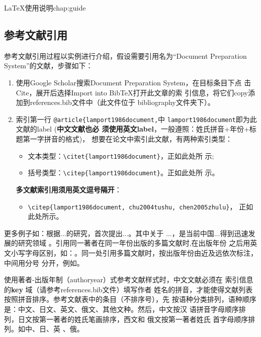 \begin{cuzchapter}{\LaTeX{}使用说明}{chap:guide}
	\subsection{参考文献引用}\label{sub:references}

	参考文献引用过程以实例进行介绍，假设需要引用名为``Document Preparation
	System''的文献，步骤如下：
	\begin{enumerate}
		\item 使用Google Scholar搜索Document Preparation System，在目标条目下点
		      击Cite，展开后选择Import into BibTeX打开此文章的索
		      引信息，将它们copy添加到references.bib文件中（此文件位于
		      bibliography文件夹下）。
		\item 索引第一行 \verb|@article{lamport1986document,|中
		      \verb|lamport1986document|即为此文献的label (\textbf{中文文献也必
			      须使用英文label}，一般遵照：姓氏拼音+年份+标题第一字拼音的格式)，
		      想要在论文中索引此文献，有两种索引类型：
		      \begin{itemize}
			      \item 文本类型：\verb|\citet{lamport1986document}|，正如此处所
			            示\citet{lamport1986document};
			      \item 括号类型：\verb|\citep{lamport1986document}|。正如此处所
			            示\citep{lamport1986document}。
		      \end{itemize}
		      \textbf{多文献索引用须用英文逗号隔开}：
		      \begin{itemize}
			      \item \verb|\citep{lamport1986document, chu2004tushu, chen2005zhulu}|，
			            正如此处所示\citep{lamport1986document, chu2004tushu, chen2005zhulu}。
		      \end{itemize}
	\end{enumerate}

	更多例子如：\citet{walls2013drought}根据...的研究，首次提出...。其中关于
	...\citep{walls2013drought}，是当前中国...得到迅速发展的研究领域
	\citep{chen1980zhongguo}。引用同一著者在同一年份出版的多篇文献时,在出版年份
	之后用英文小写字母区别，如：\citep{yuan2012lana, yuan2012lanb,
		yuan2012lanc}。同一处引用多篇文献时，按出版年份由近及远依次标注，中间用分号
	分开，例如\citep{chen1980zhongguo, stamerjohanns2009mathml, hls2012jinji,
		niu2013zonghe}。

	使用著者-出版年制（authoryear）式参考文献样式时，中文文献必须在
	索引信息的\textbf{key} 域（请参考references.bib文件）填写作者
	姓名的拼音，才能使得文献列表按照拼音排序。参考文献表中的条目（不排序号），先
	按语种分类排列，语种顺序是：中文、日文、英文、俄文、其他文种。然后，中文按汉
	语拼音字母顺序排列，日文按第一著者的姓氏笔画排序，西文和 俄文按第一著者姓氏
	首字母顺序排列。如中\citep{niu2013zonghe}、日\citep{Bohan1928}、英
	\citep{stamerjohanns2009mathml}、俄\citep{Dubrovin1906}。


\end{cuzchapter}
